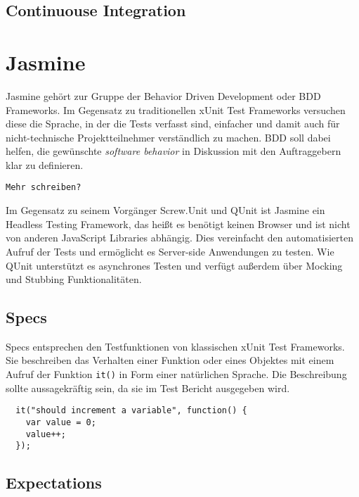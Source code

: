 \documentclass[11pt, a4paper]{article}
\begin{document}
\subsection{Continuouse Integration}

\section{Jasmine}

Jasmine\cite{jasmine_jasmine_2011} gehört zur Gruppe der Behavior Driven
Development\cite{wikipedia_behavior_2011} oder BDD Frameworks. Im Gegensatz zu
traditionellen xUnit Test Frameworks versuchen diese die Sprache, in der die
Tests verfasst sind, einfacher und damit auch für nicht-technische
Projektteilnehmer verständlich zu machen. BDD soll dabei helfen, die gewünschte
\emph{software behavior} in Diskussion mit den Auftraggebern klar zu definieren.

\begin{verbatim}
Mehr schreiben?
\end{verbatim}

Im Gegensatz zu seinem Vorgänger Screw.Unit\cite{sobo_screw.unit_2011} und QUnit
ist Jasmine ein Headless Testing Framework, das heißt es benötigt keinen
Browser und ist nicht von anderen JavaScript Libraries abhängig. Dies
vereinfacht den automatisierten Aufruf der Tests und ermöglicht es Server-side
Anwendungen zu testen. Wie QUnit unterstützt es asynchrones Testen und verfügt
außerdem über Mocking und Stubbing Funktionalitäten.

\subsection{Specs}

Specs entsprechen den Testfunktionen von klassischen xUnit Test Frameworks. Sie
beschreiben das Verhalten einer Funktion oder eines Objektes mit einem Aufruf
der Funktion \texttt{it()} in Form einer natürlichen Sprache. Die Beschreibung
sollte aussagekräftig sein, da sie im Test Bericht ausgegeben wird.

\begin{verbatim}
  it("should increment a variable", function() {
    var value = 0;
    value++;
  });
\end{verbatim}

\subsection{Expectations}
\end{document}
